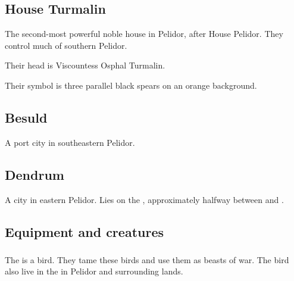 \subsection{House Turmalin}
The second-most powerful noble house in Pelidor, after House Pelidor. 
They control much of southern Pelidor. 

Their head is Viscountess Osphal Turmalin. 

Their symbol is three parallel black spears on an orange background. 









\subsection{Besuld}
A port city in southeastern Pelidor. 











\subsection{Dendrum}
A city in eastern Pelidor. 
Lies on the , approximately halfway between  and . 











\subsection{Equipment and creatures}






\subsubsection{\Grulcans}
The  is a  bird. 
They tame these birds and use them as beasts of war. 
The bird also live in the \wylde in Pelidor and surrounding lands. 









